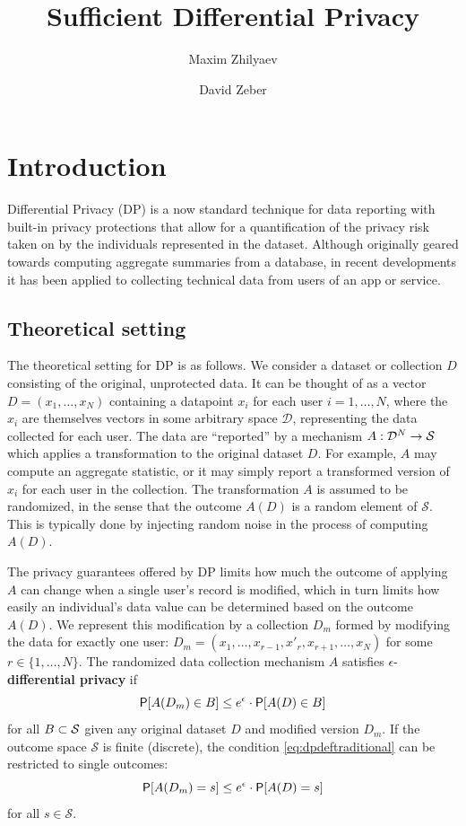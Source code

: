 \documentclass[11pt]{article}
\title{Sufficient Differential Privacy}
\author{Maxim Zhilyaev \and David Zeber}
\date{}
\newcommand{\Dsp}{\mathcal{D}}
\newcommand{\Ssp}{\mathcal{S}}
\begin{document}
\maketitle


\section{Introduction}

Differential Privacy (DP) is a now standard technique for data reporting with built-in privacy protections that allow for a quantification of the privacy risk taken on by the individuals represented in the dataset.
Although originally geared towards computing aggregate summaries from a database, in recent developments it has been applied to collecting technical data from users of an app or service.

\subsection{Theoretical setting}

The theoretical setting for DP is as follows.
We consider a dataset or collection $D$ consisting of the original, unprotected data. It can be thought of as a vector $D = (x_1,\dots, x_N)$ containing a datapoint $x_i$ for each user $i = 1,\dots,N$, where the $x_i$ are themselves vectors in some arbitrary space $\Dsp$, representing the data collected for each user.
The data are ``reported'' by a mechanism $\map{A}{\Dsp^N}{\Ssp}$ which applies a transformation to the original dataset $D$. For example, $A$ may compute an aggregate statistic, or it may simply report a transformed version of $x_i$ for each user in the collection.
The transformation $A$ is assumed to be randomized, in the sense that the outcome $A(D)$ is a random element of $\Ssp$. This is typically done by injecting random noise in the process of computing $A(D)$.

The privacy guarantees offered by DP limits how much the outcome of applying $A$ can change when a single user's record is modified, which in turn limits how easily an individual's data value can be determined based on the outcome $A(D)$.
We represent this modification by a collection $D_m$ formed by modifying the data for exactly one user: $D_m = (x_1,\dots,x_{r-1},x'_r,x_{r+1},\dots,x_N)$ for some $r \in \{1,\dots,N\}$.
The randomized data collection mechanism $A$ satisfies $\epsilon$-\textbf{differential privacy} if
\begin{equation} \label{eq:dpdeftraditional}
\P[A(D_m) \in B] \leq e^\epsilon \cdot\P[A(D) \in B]
\end{equation}
for all $B \cont \Ssp$ given any original dataset $D$ and modified version $D_m$.
If the outcome space $\Ssp$ is finite (discrete), the condition \eqref{eq:dpdeftraditional} can be restricted to single outcomes:
\begin{equation} \label{eq:dpdeftraddiscrete}
\P[A(D_m) = s] \leq e^\epsilon \cdot\P[A(D) = s]
\end{equation}
for all $s\in\Ssp$.
\end{document}
